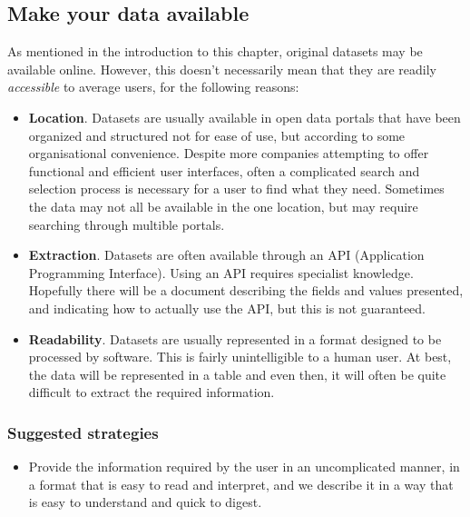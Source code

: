 \subsection{Make your data available}
    
As mentioned in the introduction to this chapter, original datasets may be available online. However, this doesn't necessarily
mean that they are readily \emph{accessible} to average users, for the following reasons:

\begin{itemize}
    \item \textbf{Location}. Datasets are usually available in open data portals that have been organized and structured not for ease of use, but according to some
          organisational convenience. 
          Despite more companies attempting to offer functional and efficient user interfaces, often a complicated search and selection process is necessary for a user to find what they need.
          Sometimes the data may not all be available in the one location, but may require searching through multible portals.

    \item \textbf{Extraction}. Datasets are often available through an API (Application Programming Interface). Using an API requires specialist knowledge.
          Hopefully there will be a document describing the fields and values presented, and indicating how to actually use the API, but this is not guaranteed.

    \item \textbf{Readability}. Datasets are usually represented in a format designed to be processed by software. This is fairly unintelligible to a human user. At best,
          the data will be represented in a table and even then, it will often be quite difficult to extract the required information.
\end{itemize}

\subsubsection*{Suggested strategies} 

\begin{itemize}
    \item Provide the information required by the user in an uncomplicated manner, in a format that is easy to read and interpret,
          and we describe it in a way that is easy to understand and quick to digest.\\
\end{itemize}
 
